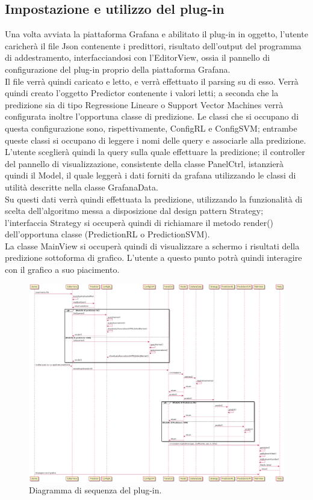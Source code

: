 \documentclass[../manuale-sviluppatore.tex]{subfiles}
\begin{document}
\subsection{Impostazione e utilizzo del plug-in}
Una volta avviata la piattaforma Grafana e abilitato il plug-in in oggetto, l'utente caricherà il file Json contenente i predittori, risultato dell'output del programma di addestramento, interfacciandosi con l'EditorView, ossia il pannello di configurazione del plug-in proprio della piattaforma Grafana. \\
Il file verrà quindi caricato e letto, e verrà effettuato il parsing su di esso. Verrà quindi creato l'oggetto Predictor contenente i valori letti; a seconda che la predizione sia di tipo Regressione Lineare o Support Vector Machines verrà configurata inoltre l'opportuna classe di predizione. Le classi che si occupano di questa configurazione sono, rispettivamente, ConfigRL e ConfigSVM; entrambe queste classi si occupano di leggere i nomi delle query e associarle alla predizione. \\
L'utente sceglierà quindi la query sulla quale effettuare la predizione; il controller del pannello di visualizzazione, consistente della classe PanelCtrl, istanzierà quindi il Model, il quale leggerà i dati forniti da grafana utilizzando le classi di utilità descritte nella classe GrafanaData. \\
Su questi dati verrà quindi effettuata la predizione, utilizzando la funzionalità di scelta dell'algoritmo messa a disposizione dal design pattern Strategy; l'interfaccia Strategy si occuperà quindi di richiamare il metodo render() dell'opportuna classe (PredictionRL o PredictionSVM). \\
La classe MainView si occuperà quindi di visualizzare a schermo i risultati della predizione sottoforma di grafico. L'utente a questo punto potrà quindi interagire con il grafico a suo piacimento.

\begin{figure}[H]
  \centering
  \includegraphics[width=15cm]{img/plugin/sequenceDiagramPlug.png}
  \caption{Diagramma di sequenza del plug-in.}
\end{figure}
\end{document}
